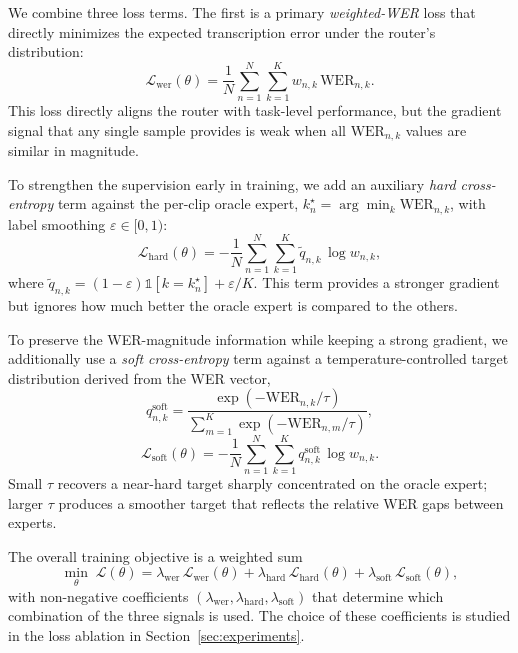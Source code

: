 \documentclass[journal]{IEEEtran}
\begin{document}
We combine three loss terms. The first is a primary
\emph{weighted-WER} loss that directly minimizes the expected
transcription error under the router's distribution:
\begin{equation}
\mathcal{L}_{\text{wer}}(\theta) =
\frac{1}{N}\sum_{n=1}^{N}\sum_{k=1}^{K}
w_{n,k}\,\mathrm{WER}_{n,k}.
\label{eq:loss_wer}
\end{equation}
This loss directly aligns the router with task-level performance, but
the gradient signal that any single sample provides is weak when all
$\mathrm{WER}_{n,k}$ values are similar in magnitude.

To strengthen the supervision early in training, we add an auxiliary
\emph{hard cross-entropy} term against the per-clip oracle expert,
$k_n^\star=\arg\min_{k}\mathrm{WER}_{n,k}$, with label smoothing
$\varepsilon\in[0,1)$:
\begin{equation}
\mathcal{L}_{\text{hard}}(\theta) =
-\frac{1}{N}\sum_{n=1}^{N}\sum_{k=1}^{K}
\tilde{q}_{n,k}\,\log w_{n,k},
\label{eq:loss_hard}
\end{equation}
where $\tilde{q}_{n,k}=(1-\varepsilon)\mathbb{1}[k=k_n^\star]+\varepsilon/K$.
This term provides a stronger gradient but ignores how much better the
oracle expert is compared to the others.

To preserve the WER-magnitude information while keeping a strong
gradient, we additionally use a \emph{soft cross-entropy} term
against a temperature-controlled target distribution derived from the
WER vector,
\begin{equation}
q_{n,k}^{\mathrm{soft}} =
\frac{\exp(-\mathrm{WER}_{n,k}/\tau)}
{\sum_{m=1}^{K}\exp(-\mathrm{WER}_{n,m}/\tau)},
\label{eq:soft_target}
\end{equation}
\begin{equation}
\mathcal{L}_{\text{soft}}(\theta) =
-\frac{1}{N}\sum_{n=1}^{N}\sum_{k=1}^{K}
q_{n,k}^{\mathrm{soft}}\,\log w_{n,k}.
\label{eq:loss_soft}
\end{equation}
Small $\tau$ recovers a near-hard target sharply concentrated on the
oracle expert; larger $\tau$ produces a smoother target that reflects
the relative WER gaps between experts.

The overall training objective is a weighted sum
\begin{equation}
\min_{\theta}\;
\mathcal{L}(\theta) =
\lambda_{\text{wer}}\,\mathcal{L}_{\text{wer}}(\theta)
+\lambda_{\text{hard}}\,\mathcal{L}_{\text{hard}}(\theta)
+\lambda_{\text{soft}}\,\mathcal{L}_{\text{soft}}(\theta),
\label{eq:total_objective}
\end{equation}
with non-negative coefficients
$(\lambda_{\text{wer}},\lambda_{\text{hard}},\lambda_{\text{soft}})$
that determine which combination of the three signals is used. The
choice of these coefficients is studied in the loss ablation in
Section~\ref{sec:experiments}.
\end{document}
